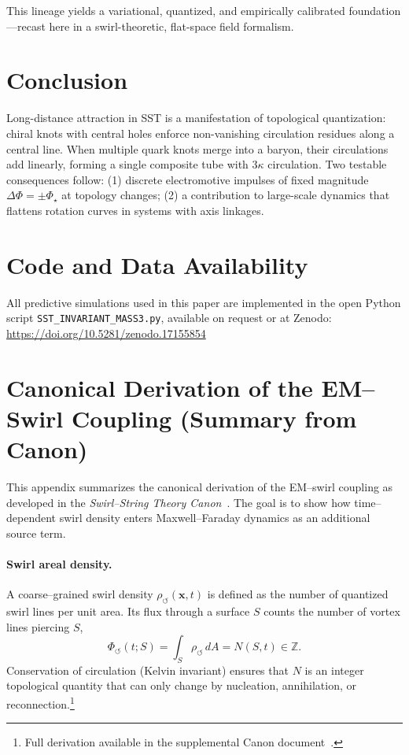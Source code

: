 \documentclass[11pt]{article}
\begin{document}
        This lineage yields a variational, quantized, and empirically calibrated foundation—recast here in a swirl-theoretic, flat-space field formalism.

\section{Conclusion}

    Long-distance attraction in SST is a manifestation of topological quantization: chiral knots with central holes enforce non-vanishing circulation residues along a central line.
    When multiple quark knots merge into a baryon, their circulations add linearly, forming a single composite tube with $3\kappa$ circulation.
    Two testable consequences follow: (1) discrete electromotive impulses of fixed magnitude $\Delta\Phi=\pm\Phi_\star$ at topology changes; (2) a contribution to large-scale dynamics that flattens rotation curves in systems with axis linkages.


\section*{Code and Data Availability}
    All predictive simulations used in this paper are implemented in the open Python script \texttt{SST\_INVARIANT\_MASS3.py}, available on request or at Zenodo: \url{https://doi.org/10.5281/zenodo.17155854}


\appendix

    \section{Canonical Derivation of the EM–Swirl Coupling (Summary from Canon)}
    \label{sec:canonical-derivation-of-the-emswirl-coupling}

        This appendix summarizes the canonical derivation of the EM–swirl coupling as developed in the
        \emph{Swirl–String Theory Canon}~\cite{Iskandarani_SST_Canon_v0_5_9_2025}. The goal is to show how
        time–dependent swirl density enters Maxwell–Faraday dynamics as an additional source term.

        \paragraph*{Swirl areal density.}
        A coarse–grained swirl density $\rho_{\circlearrowleft}(\mathbf{x},t)$ is defined as the number of
        quantized swirl lines per unit area. Its flux through a surface $S$ counts the number of vortex lines
        piercing $S$,
        \[
        \Phi_{\circlearrowleft}(t; S) = \int_S \rho_{\circlearrowleft} \, dA = N(S,t) \in \mathbb{Z}.
        \]
        Conservation of circulation (Kelvin invariant) ensures that $N$ is an integer topological quantity
        that can only change by nucleation, annihilation, or reconnection.\footnote{Full derivation available in the supplemental Canon document~\cite{Iskandarani_SST_Canon_v0_5_9_2025}.}
\end{document}
